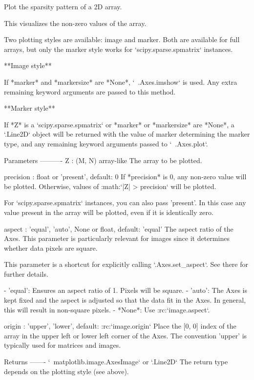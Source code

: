 \begin{DoxyVerb}
\begin{DoxyVerb}Plot the sparsity pattern of a 2D array.

This visualizes the non-zero values of the array.

Two plotting styles are available: image and marker. Both
are available for full arrays, but only the marker style
works for `scipy.sparse.spmatrix` instances.

**Image style**

If *marker* and *markersize* are *None*, `~.Axes.imshow` is used. Any
extra remaining keyword arguments are passed to this method.

**Marker style**

If *Z* is a `scipy.sparse.spmatrix` or *marker* or *markersize* are
*None*, a `.Line2D` object will be returned with the value of marker
determining the marker type, and any remaining keyword arguments
passed to `~.Axes.plot`.

Parameters
----------
Z : (M, N) array-like
    The array to be plotted.

precision : float or 'present', default: 0
    If *precision* is 0, any non-zero value will be plotted. Otherwise,
    values of :math:`|Z| > precision` will be plotted.

    For `scipy.sparse.spmatrix` instances, you can also
    pass 'present'. In this case any value present in the array
    will be plotted, even if it is identically zero.

aspect : {'equal', 'auto', None} or float, default: 'equal'
    The aspect ratio of the Axes.  This parameter is particularly
    relevant for images since it determines whether data pixels are
    square.

    This parameter is a shortcut for explicitly calling
    `.Axes.set_aspect`. See there for further details.

    - 'equal': Ensures an aspect ratio of 1. Pixels will be square.
    - 'auto': The Axes is kept fixed and the aspect is adjusted so
      that the data fit in the Axes. In general, this will result in
      non-square pixels.
    - *None*: Use :rc:`image.aspect`.

origin : {'upper', 'lower'}, default: :rc:`image.origin`
    Place the [0, 0] index of the array in the upper left or lower left
    corner of the Axes. The convention 'upper' is typically used for
    matrices and images.

Returns
-------
`~matplotlib.image.AxesImage` or `.Line2D`
    The return type depends on the plotting style (see above).


\end{DoxyVerb}
\end{DoxyVerb}
